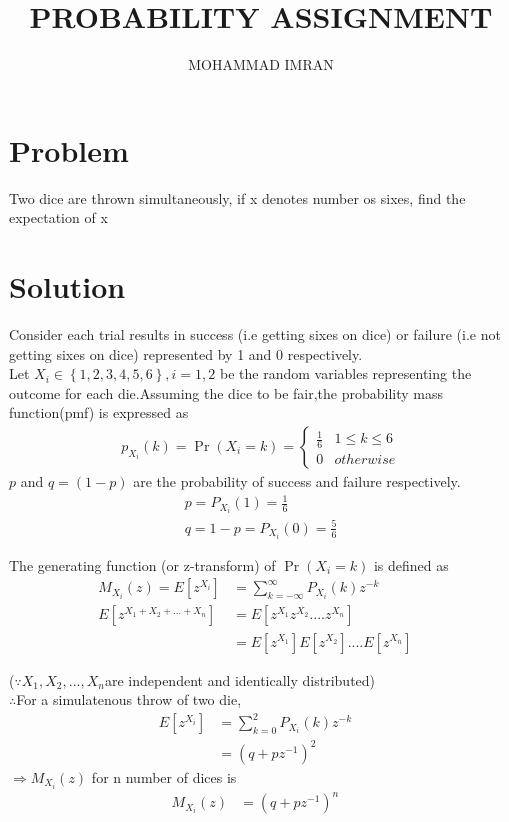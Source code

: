 \documentclass[a4paper,10pt,two column]{article}
\title{PROBABILITY ASSIGNMENT}
\author{MOHAMMAD IMRAN}
\providecommand{\cbrak}[1]{\ensuremath{\left\{#1\right\}}}
\providecommand{\sbrak}[1]{\ensuremath{{}\left[#1\right]}}
\providecommand{\pr}[1]{\ensuremath{\Pr\left(#1\right)}}
\begin{document}
\maketitle
\bigskip


\section{\textbf{Problem }}
Two dice are thrown simultaneously, if x denotes number os sixes, find the expectation of x


\section{\textbf{Solution }}
Consider each trial results in success (i.e getting sixes on dice) or failure (i.e not getting sixes on dice) represented by 1 and 0 respectively.
\\

Let $X_i \in \cbrak{1,2,3,4,5,6} , i = 1,2$ be the random variables representing the outcome for each die.Assuming the dice to be fair,the probability mass function(pmf) is expressed as
\\
\begin{align}
 p_{X_i}(k) = \Pr(X_i=k) =
\begin{cases}
\frac{1}{6} & 1 \leq k \leq 6 \\
0 & otherwise
\end{cases} 
\end{align}
$p$ and $q = (1 - p)$ are the probability of success and failure respectively.
\begin{align}
& p = P_{X_i}(1) = \frac{1}{6}&               \label{eq:1}
\\            
& q = 1 - p = P_{X_i}(0) = \frac{5}{6}&       \label{eq:2}
\end{align}



The generating function (or z-transform) of $\pr{X_i =k}$  is defined as 
\\
\begin{align}
M_{X_i}(z) = E\sbrak{z^{X_i}} &= \sum_{k=-\infty}^{\infty} P_{X_i}(k)z^{-k}&
\\
E\sbrak{z^{X_1+X_2+...+X_n}}&= E\sbrak{z^{X_1}z^{X_2}....z^{X_n}}& \nonumber
\\
&= E\sbrak{z^{X_1}}E\sbrak{z^{X_2}}....E\sbrak{z^{X_n}}&
\end{align} 

($\because X_1,X_2,...,X_n$are independent and identically distributed)
\\
$\therefore$For a simulatenous throw of two die,
\begin{align}
E\sbrak{z^{X_i}}& = \sum_{k=0}^{2} P_{X_i}(k) z^{-k}&
\\
&= (q+pz^{-1})^{2}&
\end{align}
$\Rightarrow M_{X_i}(z)$ for n number of dices is
\begin{align}
 M_{X_i}(z)&= (q + pz^{-1})^n&
\end{align}
\end{document}
